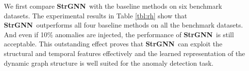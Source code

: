 \documentclass{article}
\newcommand{\model}{\textbf{StrGNN}~}
\begin{document}
We first compare \model with the baseline methods on six benchmark datasets. %
The experimental results in Table \ref{tbl:rh} show that \model outperforms all four baseline methods on all the benchmark datasets. And even if 10\% anomalies are injected, the performance of \model is still acceptable. %
This outstanding effect proves that \model can exploit the structural and temporal features effectively and the learned representation of the dynamic graph structure is well suited for the anomaly detection task. %

\end{document}
